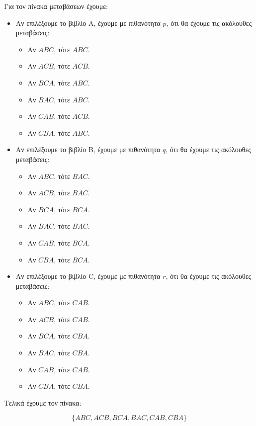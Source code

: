 \documentclass[11pt,a4paper]{article}
\newcommand{\english}[1]{\foreignlanguage{english}{{#1}}}
\begin{document}
Για τον πίνακα μεταβάσεων έχουμε:
\begin{itemize}
    \item Αν επιλέξουμε το βιβλίο Α, έχουμε με πιθανότητα $p$, ότι θα έχουμε τις ακόλουθες μεταβάσεις:
          \begin{itemize}
              \item Αν $ABC$, τότε $ABC$.
              \item Αν $ACB$, τότε $ACB$.
              \item Αν $BCA$, τότε $ABC$.
              \item Αν $BAC$, τότε $ABC$.
              \item Αν $CAB$, τότε $ACB$.
              \item Αν $CBA$, τότε $ABC$.
          \end{itemize}
    \item Αν επιλέξουμε το βιβλίο B, έχουμε με πιθανότητα $q$, ότι θα έχουμε τις ακόλουθες μεταβάσεις:
          \begin{itemize}
              \item Αν $ABC$, τότε $BAC$.
              \item Αν $ACB$, τότε $BAC$.
              \item Αν $BCA$, τότε $BCA$.
              \item Αν $BAC$, τότε $BAC$.
              \item Αν $CAB$, τότε $BCA$.
              \item Αν $CBA$, τότε $BCA$.
          \end{itemize}
    \item Αν επιλέξουμε το βιβλίο \english{C}, έχουμε με πιθανότητα $r$, ότι θα έχουμε τις ακόλουθες μεταβάσεις:
          \begin{itemize}
              \item Αν $ABC$, τότε $CAB$.
              \item Αν $ACB$, τότε $CAB$.
              \item Αν $BCA$, τότε $CBA$.
              \item Αν $BAC$, τότε $CBA$.
              \item Αν $CAB$, τότε $CAB$.
              \item Αν $CBA$, τότε $CBA$.
          \end{itemize}
\end{itemize}

Τελικά έχουμε τον πίνακα:

$$
    \{ABC, ACB, BCA, BAC, CAB, CBA\}
$$
\end{document}
